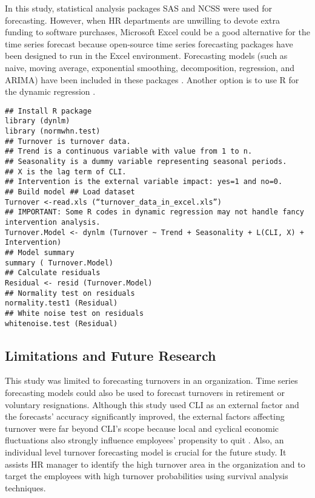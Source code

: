 In this study, statistical analysis packages SAS and NCSS were used for forecasting. However, when HR departments are unwilling to devote extra funding to software purchases, Microsoft Excel could be a good alternative for the time series forecast because open-source time series forecasting packages have been designed to run in the Excel environment. Forecasting models (such as naive, moving average, exponential smoothing, decomposition, regression, and ARIMA) have been included in these packages  \citep{warren2008}. Another option is to use R for the dynamic regression \citep{hyndman2014}. 
\begin{lstlisting}
## Install R package
library (dynlm)
library (normwhn.test)
## Turnover is turnover data.  
## Trend is a continuous variable with value from 1 to n. 
## Seasonality is a dummy variable representing seasonal periods. 
## X is the lag term of CLI.
## Intervention is the external variable impact: yes=1 and no=0.
## Build model ## Load dataset
Turnover <-read.xls (“turnover_data_in_excel.xls”)
## IMPORTANT: Some R codes in dynamic regression may not handle fancy intervention analysis.
Turnover.Model <- dynlm (Turnover ~ Trend + Seasonality + L(CLI, X) + Intervention) 
## Model summary
summary ( Turnover.Model)
## Calculate residuals
Residual <- resid (Turnover.Model)
## Normality test on residuals
normality.test1 (Residual)
## White noise test on residuals
whitenoise.test (Residual)
\end{lstlisting}

\subsection{Limitations and Future Research}
This study was limited to forecasting turnovers in an organization. Time series forecasting models could also be used to forecast turnovers in retirement or voluntary resignations. Although this study used  CLI as an external factor and the forecasts' accuracy significantly improved, the external factors affecting turnover were far beyond CLI's scope because local and cyclical economic fluctuations also strongly influence employees' propensity to quit \citep{abelson1984}. Also, an individual level turnover forecasting model is crucial for the future study. It assists HR manager to identify the high turnover area in the organization and to target the employees with high turnover probabilities using survival analysis techniques. 

